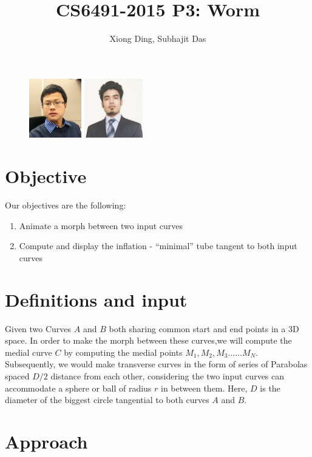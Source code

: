 \documentclass[twoside,11pt]{article}
\begin{document}
\title{CS6491-2015 P3: Worm}
\author{Xiong Ding, Subhajit Das}
\date{}
\maketitle
\begin{figure} [H]
    \centering
    \includegraphics[width=0.9in]{selfie}
    \includegraphics[width=1.0in]{das_PIC}
\end{figure}


\section{Objective}
Our objectives are the following:
 \begin{enumerate}
\item Animate a morph between two input curves 
\item Compute and display the inflation - “minimal” tube tangent to both input curves
 \end{enumerate}


\section{Definitions and input}
Given two Curves $ A $ and $ B $ both sharing common start and end points in a 3D space. In order to make the morph between these curves,we will compute the medial curve $ C $ by computing the medial points $ M_1, M_2, M_3 ......M_N $.
Subsequently, we would make transverse curves in the form of series of Parabolas spaced $ D/2 $ distance from each other, considering the two input curves can accommodate a sphere or ball of radius $ r $ in between them. Here, $D$ is the diameter of the biggest circle tangential to both curves $A$ and $B$.

\section{Approach}
\end{document}
